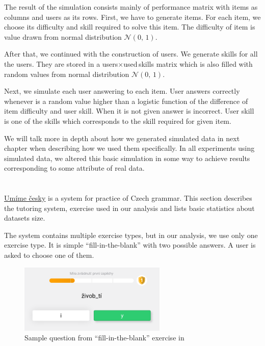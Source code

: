 \documentclass[
  digital, %
  table,   %
  nolof,     %
  nolot,     %
  nocover,
  color,
  final, %
]{fithesis3}
\begin{document}
The result of the simulation consists mainly of performance matrix with items as columns and users as its rows. First, we have to generate items. For each item, we choose its difficulty and skill required to solve this item. The difficulty of item is value drawn from normal distribution $\mathcal{N}(0,\,1)$.

After that, we continued with the construction of users. We generate skills for all the users. They are stored in a users$\times$used\,skills matrix which is also filled with random values from normal distribution $\mathcal{N}(0,\,1)$.

Next, we simulate each user answering to each item. User answers correctly whenever is a random value higher than a logistic function of the difference of item difficulty and user skill. When it is not given answer is incorrect. User skill is one of the skills which corresponds to the skill required for given item.

We will talk more in depth about how we generated simulated data in next chapter when describing how we used them specifically. In all experiments using simulated data, we altered this basic simulation in some way to achieve results corresponding to some attribute of real data.


\section{\umimeCesky{}}\label{umime-cesky}


\href{https://umimecesky.cz/}{Umíme česky} is a system for practice of Czech grammar. This section describes the tutoring system, exercise used in our analysis and lists basic statistics about datasets size.

The system contains multiple exercise types, but in our analysis, we use only one exercise type. It is simple ``fill-in-the-blank'' with two possible answers. A user is asked to choose one of them.

\begin{figure}
  \includegraphics[width=7cm]{img/umimecesky_doplnovacka}
  \caption{Sample question from ``fill-in-the-blank'' exercise in \umimeCesky{}}
  \label{fig:umimeceskydoplnovacka}
\end{figure}
\end{document}
